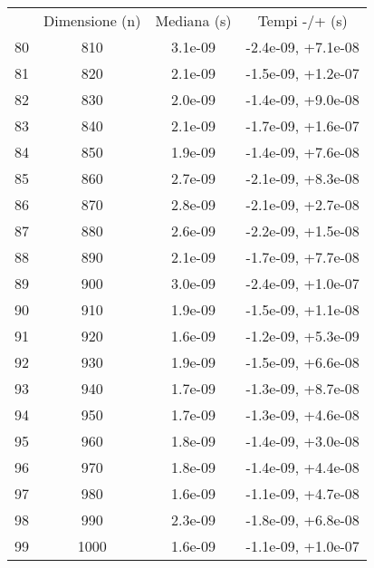 \begin{table}
\centering
\begin{adjustbox}{width=1\textwidth/2}
\begin{tabular}{|c|c|c|c|}
\hline
 & Dimensione (n) & Mediana (s) & Tempi -/+ (s) \\
80 & 810 & 3.1e-09 & -2.4e-09, +7.1e-08 \\
\cline{1-4}
81 & 820 & 2.1e-09 & -1.5e-09, +1.2e-07 \\
\cline{1-4}
82 & 830 & 2.0e-09 & -1.4e-09, +9.0e-08 \\
\cline{1-4}
83 & 840 & 2.1e-09 & -1.7e-09, +1.6e-07 \\
\cline{1-4}
84 & 850 & 1.9e-09 & -1.4e-09, +7.6e-08 \\
\cline{1-4}
85 & 860 & 2.7e-09 & -2.1e-09, +8.3e-08 \\
\cline{1-4}
86 & 870 & 2.8e-09 & -2.1e-09, +2.7e-08 \\
\cline{1-4}
87 & 880 & 2.6e-09 & -2.2e-09, +1.5e-08 \\
\cline{1-4}
88 & 890 & 2.1e-09 & -1.7e-09, +7.7e-08 \\
\cline{1-4}
89 & 900 & 3.0e-09 & -2.4e-09, +1.0e-07 \\
\cline{1-4}
90 & 910 & 1.9e-09 & -1.5e-09, +1.1e-08 \\
\cline{1-4}
91 & 920 & 1.6e-09 & -1.2e-09, +5.3e-09 \\
\cline{1-4}
92 & 930 & 1.9e-09 & -1.5e-09, +6.6e-08 \\
\cline{1-4}
93 & 940 & 1.7e-09 & -1.3e-09, +8.7e-08 \\
\cline{1-4}
94 & 950 & 1.7e-09 & -1.3e-09, +4.6e-08 \\
\cline{1-4}
95 & 960 & 1.8e-09 & -1.4e-09, +3.0e-08 \\
\cline{1-4}
96 & 970 & 1.8e-09 & -1.4e-09, +4.4e-08 \\
\cline{1-4}
97 & 980 & 1.6e-09 & -1.1e-09, +4.7e-08 \\
\cline{1-4}
98 & 990 & 2.3e-09 & -1.8e-09, +6.8e-08 \\
\cline{1-4}
99 & 1000 & 1.6e-09 & -1.1e-09, +1.0e-07 \\
\cline{1-4}
\end{tabular}
\end{adjustbox}
\end{table}
